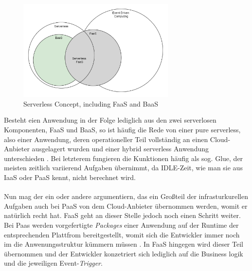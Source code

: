 \documentclass[11pt]{article}
\begin{document}
\begin{figure}[H]
\caption{Serverless Concept, including FaaS and BaaS}
\label{fig:serverlessBaaSandPaas}
\centering
\includegraphics[width=0.7\textwidth]{Serverless}
\end{figure} 
Besteht eien Anwendung in der Folge lediglich aus den zwei \glqq serverlosen\grqq{} Komponenten, FaaS und BaaS, so ist häufig die Rede von einer \glqq pure serverless\grqq{}, also einer Anwendung, deren operationeller Teil vollständig an einen Cloud-Anbieter ausgelagert wurden und einer \glqq hybrid serverless\grqq{} Anwendung unterschieden \cite{leitner2019mixed}. Bei letzterem fungieren die Kunktionen häufig als sog. \glqq Glue\grqq{}, der meisten zeitlich variierend Aufgaben übernimmt, da IDLE-Zeit, wie man sie aus IaaS oder PaaS kennt, nicht berechnet wird.\\\\Nun mag der ein oder andere argumentiern, das ein Großteil der infrasturkurellen Aufgaben auch bei PaaS von dem Cloud-Anbieter übernommen werden, womit er natürlich recht hat. FaaS geht an dieser Stelle jedoch noch einen Schritt weiter. Bei Paas werden vorgefertigte \textit{Packages} einer Anwendung auf der Runtime der entsprechenden Plattfrom bereitgestellt, womit sich die Entwickler immer noch im die Anwenungsstruktur kümmern müssen \cite{kaplan2019framework}. In FaaS hingegen wird dieser Teil übernommen und der Entwickler konzetriert sich lediglich auf die Business logik und die jeweiligen Event-\textit{Trigger}.\\\\
\end{document}
